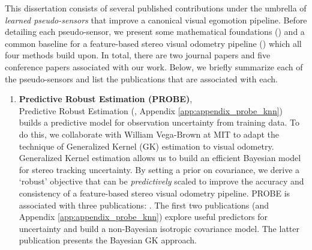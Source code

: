 This dissertation consists of several published contributions under the umbrella of \textit{learned pseudo-sensors} that improve a canonical visual egomotion pipeline. Before detailing each pseudo-sensor, we present some mathematical foundations () and a common baseline for a feature-based stereo visual odometry pipeline () which all four methods build upon. In total, there are two journal papers and five conference papers associated with our work. Below, we briefly summarize each of the pseudo-sensors and list the publications that are associated with each.
\begin{enumerate}
\item \textbf{Predictive Robust Estimation (PROBE)},  \\
Predictive Robust Estimation (, Appendix \ref{app:appendix_probe_knn}) builds a predictive model for observation uncertainty from training data. To do this, we collaborate with William Vega-Brown at MIT to adapt the technique of Generalized Kernel (GK) estimation \citep{Vega-Brown2014-sb} to visual odometry. Generalized Kernel estimation allows us to build an efficient Bayesian model for stereo tracking uncertainty. By setting a prior on covariance, we derive a `robust' objective that can be \textit{predictively} scaled to improve the accuracy and consistency of a feature-based stereo visual odometry pipeline. PROBE is associated with three publications: \cite{2015_Peretroukhin_PROBE,2015_Peretroukhin_Get;Peretroukhin2016-om}. The first two publications (and Appendix \ref{app:appendix_probe_knn}) explore useful predictors for uncertainty and build a non-Bayesian isotropic covariance model. The latter publication presents the Bayesian GK approach.


\end{enumerate}
